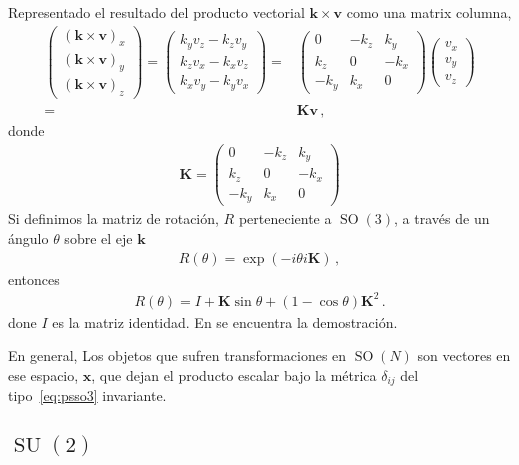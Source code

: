 Representado el resultado del producto vectorial $\boldsymbol{k}\times\boldsymbol{v}$ como una matrix columna,
\begin{align}
  \begin{pmatrix} (\boldsymbol{k}\times\boldsymbol{v})_x \\ (\boldsymbol{k}\times\boldsymbol{v})_y \\ (\boldsymbol{k}\times\boldsymbol{v})_z \end{pmatrix} = \begin{pmatrix} k_y v_z - k_z v_y \\ k_z v_x - k_x v_z \\ k_x v_y - k_y v_x \end{pmatrix} =& \begin{pmatrix} 0 & -k_z & k_y \\ k_z & 0 & -k_x \\ -k_y & k_x & 0 \end{pmatrix} \begin{pmatrix} v_x \\ v_y \\ v_z \end{pmatrix} \nonumber\\
=& \boldsymbol{K} \boldsymbol{v}\,,
\end{align}
donde
\begin{align}
  \boldsymbol{K}=\begin{pmatrix} 0 & -k_z & k_y \\ k_z & 0 & -k_x \\ -k_y & k_x & 0 \end{pmatrix}
\end{align}
Si definimos la matriz de rotación, $R$ perteneciente a $\operatorname{SO}(3)$, a través de un ángulo $\theta$ sobre el eje $\boldsymbol{k}$
\begin{align}
  R(\theta)=\exp \left( - i \theta i \boldsymbol{K} \right)\,,
\end{align}
entonces
\begin{align}
  R(\theta)=I+ \boldsymbol{K} \sin\theta + (1-\cos\theta)\boldsymbol{K}^2\,.
\end{align}
done $I$ es la matriz identidad. En \cite{rodriguez} se encuentra la demostración.

En general, Los objetos que sufren transformaciones en $\operatorname{SO}(N)$ son vectores en ese espacio, $\boldsymbol{x}$, que dejan el producto escalar bajo la métrica $\delta_{ij}$ del tipo~\eqref{eq:psso3} invariante.

\subsection{$\operatorname{SU}(2)$} 

